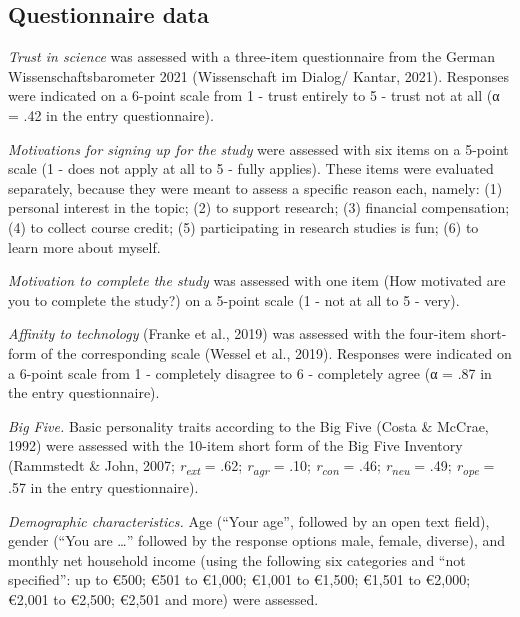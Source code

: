 \documentclass[authordate, empirical,issue]{jote-new-article}
\begin{document}
	\subsection{Questionnaire data}



	\emph{Trust in science} was assessed with a three-item questionnaire from the German Wissenschaftsbarometer 2021 (Wissenschaft im Dialog/ Kantar, 2021). Responses were indicated on a 6-point scale from 1 - trust entirely to 5 - trust not at all (α = .42 in the entry questionnaire).



	\emph{Motivations for signing up for the study }were assessed with six items on a 5-point scale (1 - does not apply at all to 5 - fully applies). These items were evaluated separately, because they were meant to assess a specific reason each, namely: (1) personal interest in the topic; (2) to support research; (3) financial compensation; (4) to collect course credit; (5) participating in research studies is fun; (6) to learn more about myself.



	\emph{Motivation to complete the study }was assessed with one item (How motivated are you to complete the study?) on a 5-point scale (1 - not at all to 5 - very).



	\emph{Affinity to technology} (Franke et al., 2019) was assessed with the four-item short-form of the corresponding scale (Wessel et al., 2019). Responses were indicated on a 6-point scale from 1 - completely disagree to 6 - completely agree (α = .87 in the entry questionnaire).



	\emph{Big Five. }Basic personality traits according to the Big Five (Costa \& McCrae, 1992) were assessed with the 10-item short form of the Big Five Inventory (Rammstedt \& John, 2007;\emph{ r}\textsubscript{\emph{ext}} = .62;\emph{ r}\textsubscript{\emph{agr}} = .10; \emph{r}\textsubscript{\emph{con}} = .46;\emph{ r}\textsubscript{\emph{neu}} = .49;\emph{ r}\textsubscript{\emph{ope}} = .57 in the entry questionnaire).



	\emph{Demographic characteristics.} Age (“Your age”, followed by an open text field), gender (“You are …” followed by the response options male, female, diverse), and monthly net household income (using the following six categories and “not specified”: up to €500; €501 to €1,000; €1,001 to €1,500; €1,501 to €2,000; €2,001 to €2,500; €2,501 and more) were assessed.
\end{document}
